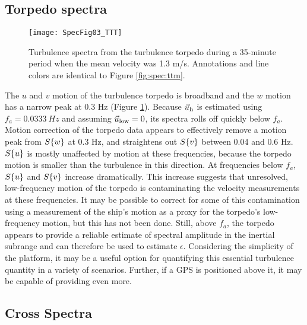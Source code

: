 \subsection{Torpedo spectra}

\begin{figure}[t]
  \centering
  \texttt{[image: SpecFig03\_TTT]}
  \caption{Turbulence spectra from the turbulence torpedo during a 35-minute period when the mean velocity was 1.3 m/s. Annotations and line colors are identical to Figure \ref{fig:spec:ttm}.}
  \label{fig:spec:torpedo}
\end{figure}

The $u$ and $v$ motion of the turbulence torpedo is broadband and the $w$ motion has a narrow peak at 0.3 Hz (Figure \ref{fig:spec:torpedo}). Because $\vec{u}_\mathrm{h}$ is estimated using $f_a = 0.0333\ Hz$ and assuming $\vec{u}_\mathrm{low}=0$, its spectra rolls off quickly below $f_a$.  Motion correction of the torpedo data appears to effectively remove a motion peak from $S\{w\}$ at 0.3 Hz, and straightens out $S\{v\}$ between 0.04 and 0.6 Hz. $S\{u\}$ is mostly unaffected by motion at these frequencies, because the torpedo motion is smaller than the turbulence in this direction. At frequencies below $f_a$, $S\{u\}$ and $S\{v\}$ increase dramatically. This increase suggests that unresolved, low-frequency motion of the torpedo is contaminating the velocity measurements at these frequencies. It may be possible to correct for some of this contamination using a measurement of the ship's motion as a proxy for the torpedo's low-frequency motion, but this has not been done. Still, above $f_a$, the torpedo appears to provide a reliable estimate of spectral amplitude in the inertial subrange and can therefore be used to estimate $\epsilon$. Considering the simplicity of the platform, it may be a useful option for quantifying this essential turbulence quantity in a variety of scenarios. Further, if a GPS is positioned above it, it may be capable of providing even more.


\subsection{Cross Spectra}


